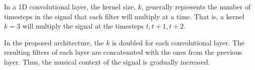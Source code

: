 
In a 1D convolutional layer, the kernel size, $k$, generally
represents the number of timesteps in the signal that each
filter will multiply at a time. That is, a kernel $k=3$ will
multiply the signal at the timesteps $t, t+1, t+2$.

In the proposed architecture, the $k$ is doubled for each
convolutional layer. The resulting filters of each layer are
concatenated with the ones from the previous layer. Thus,
the musical context of the signal is gradually increased.
